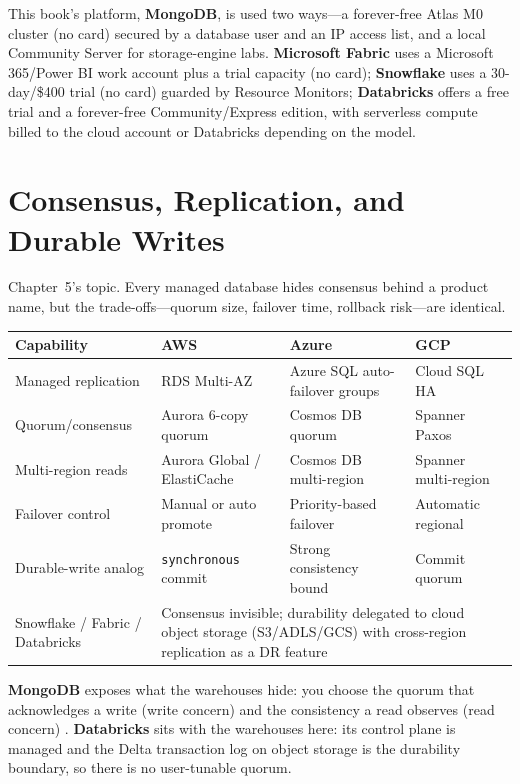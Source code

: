 \noindent This book's platform, \textbf{MongoDB}, is used two ways---a forever-free Atlas M0
cluster (no card) secured by a database user and an IP access list, and a local Community Server
for storage-engine labs. \textbf{Microsoft Fabric} uses a Microsoft 365/Power BI work account plus
a trial capacity (no card); \textbf{Snowflake} uses a 30-day/\$400 trial (no card) guarded by
Resource Monitors; \textbf{Databricks} offers a free trial and a forever-free Community/Express
edition, with serverless compute billed to the cloud account or Databricks depending on the model.

\section{Consensus, Replication, and Durable Writes}
%
Chapter~5's topic. Every managed database hides consensus behind a product name, but the
trade-offs---quorum size, failover time, rollback risk---are identical.

\begin{center}
\footnotesize
\begin{tabular}{@{}p{2.9cm}p{3.0cm}p{3.0cm}p{3.0cm}@{}}
\toprule
\textbf{Capability} & \textbf{AWS} & \textbf{Azure} & \textbf{GCP} \\
\midrule
Managed replication & RDS Multi-AZ & Azure SQL auto-failover groups & Cloud SQL HA \\
Quorum/consensus & Aurora 6-copy quorum & Cosmos DB quorum & Spanner Paxos \\
Multi-region reads & Aurora Global / ElastiCache & Cosmos DB multi-region & Spanner multi-region \\
Failover control & Manual or auto promote & Priority-based failover & Automatic regional \\
Durable-write analog & \texttt{synchronous} commit & Strong consistency bound & Commit quorum \\
\addlinespace
Snowflake / Fabric / Databricks & \multicolumn{3}{l}{Consensus invisible; durability delegated to cloud object storage (S3/ADLS/GCS) with cross-region replication as a DR feature} \\
\bottomrule
\end{tabular}
\end{center}

\noindent \textbf{MongoDB} exposes what the warehouses hide: you choose the quorum that
acknowledges a write (write concern) and the consistency a read observes (read concern)
\cite{mongodbReplicationDocs,ongaro2014raft}. \textbf{Databricks} sits with the warehouses here:
its control plane is managed and the Delta transaction log on object storage is the durability
boundary, so there is no user-tunable quorum.

